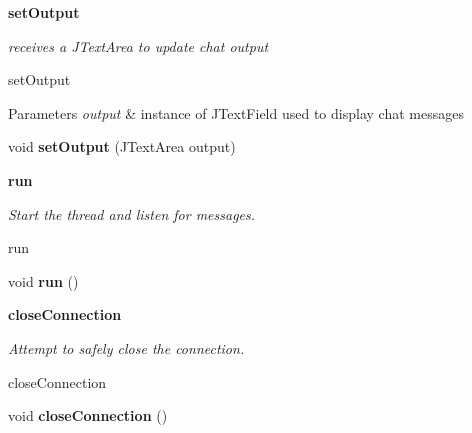 \begin{Indent}{\bf set\+Output}\par
{\em receives a J\+Text\+Area to update chat output

set\+Output


\begin{DoxyParams}{Parameters}
{\em output} & instance of J\+Text\+Field used to display chat messages \\
\hline
\end{DoxyParams}
}\begin{DoxyCompactItemize}
\item 
\hypertarget{classbattleship_1_1network_1_1ClientConnection_adb237d94753577d3ad7a3bf54690e703}{}void {\bfseries set\+Output} (J\+Text\+Area output)\label{classbattleship_1_1network_1_1ClientConnection_adb237d94753577d3ad7a3bf54690e703}

\end{DoxyCompactItemize}
\end{Indent}
\begin{Indent}{\bf run}\par
{\em Start the thread and listen for messages.

run }\begin{DoxyCompactItemize}
\item 
\hypertarget{classbattleship_1_1network_1_1ClientConnection_a756f268bedbe40b96ade6d26537819e7}{}void {\bfseries run} ()\label{classbattleship_1_1network_1_1ClientConnection_a756f268bedbe40b96ade6d26537819e7}

\end{DoxyCompactItemize}
\end{Indent}
\begin{Indent}{\bf close\+Connection}\par
{\em Attempt to safely close the connection.

close\+Connection }\begin{DoxyCompactItemize}
\item 
\hypertarget{classbattleship_1_1network_1_1ClientConnection_ab3c6a6152d8cc9e9f48958ef60be8dd1}{}void {\bfseries close\+Connection} ()\label{classbattleship_1_1network_1_1ClientConnection_ab3c6a6152d8cc9e9f48958ef60be8dd1}

\end{DoxyCompactItemize}
\end{Indent}
